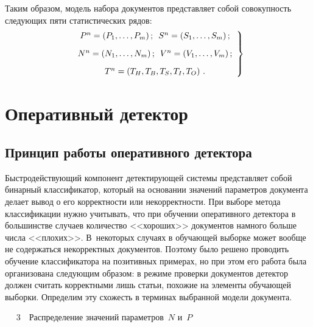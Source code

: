 \begin{multicols}{2}
    Таким образом, модель набора документов представляет собой совокупность 
следующих пяти статистических рядов:
  \begin{equation}
  \left.
  \begin{array}{c}
  P^n=(P_1, \ldots , P_m)\,;\enskip S^n=(S_1, \ldots , S_m)\,;\\[9pt]
  N^n=(N_1, \ldots , N_m)\,;\enskip V^n=(V_1, \ldots ,V_m)\,;\\[9pt]
  T^{n} =\left(T_{H}, T_{B}, T_{S}, 
T_{I}, T_{O}\right)\,.
  \end{array}
  \right\}
  \label{e3-and}
  \end{equation}

\section{Оперативный детектор}

\subsection{Принцип работы оперативного детектора}
  
    Быстродействующий компонент детек\-ти\-ру\-ющей системы представляет 
собой бинарный классификатор, который на основании значений параметров 
документа делает вывод о его корректности или некорректности. При выборе 
метода классификации нужно учитывать, что при обучении оперативного 
детектора в большинстве случаев количество <<хороших>> документов 
намного больше числа <<плохих>>. В~некоторых случаях в обучающей 
выборке может вообще не содержаться некорректных документов. Поэтому 
было решено проводить обучение классификатора на позитивных примерах, но 
при этом его работа была организована следующим образом: в режиме 
проверки документов детектор должен считать корректными лишь статьи, 
похожие на элементы обучающей выборки. Определим эту схожесть в 
терминах выбранной модели документа.

\begin{center}  %
\vspace*{-3pt}
\mbox{%
 \epsfxsize=78.877mm
 }
 \vspace*{6pt}
{{\figurename~3}\ \ \small{Распределение значений параметров~$N$ и~$P$}}
 \end{center}


\vspace*{6pt}

\addtocounter{figure}{1}


\end{multicols}
